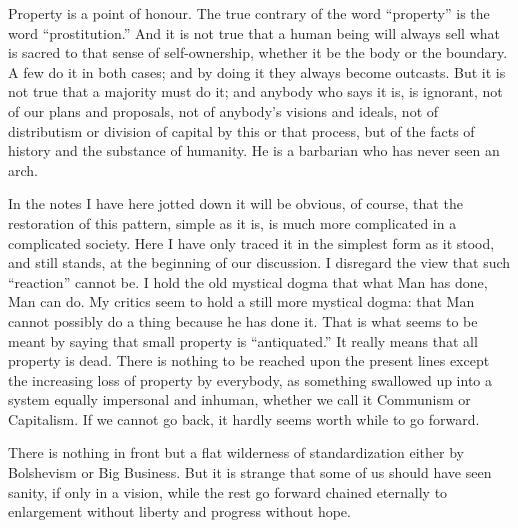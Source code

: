 \documentclass{book}
\begin{document}
Property is a point of honour. The true contrary of the word “property” is the word “prostitution.” And it is not true that a human being will always sell what is sacred to that sense of self-ownership, whether it be the body or the boundary. A few do it in both cases; and by doing it they always become outcasts. But it is not true that a majority must do it; and anybody who says it is, is ignorant, not of our plans and proposals, not of anybody’s visions and ideals, not of distributism or division of capital by this or that process, but of the facts of history and the substance of humanity. He is a barbarian who has never seen an arch.

In the notes I have here jotted down it will be obvious, of course, that the restoration of this pattern, simple as it is, is much more complicated in a complicated society. Here I have only traced it in the simplest form as it stood, and still stands, at the beginning of our discussion. I disregard the view that such “reaction” cannot be. I hold the old mystical dogma that what Man has done, Man can do. My critics seem to hold a still more mystical dogma: that Man cannot possibly do a thing because he has done it. That is what seems to be meant by saying that small property is “antiquated.” It really means that all property is dead. There is nothing to be reached upon the present lines except the increasing loss of property by everybody, as something swallowed up into a system equally impersonal and inhuman, whether we call it Communism or Capitalism. If we cannot go back, it hardly seems worth while to go forward.

There is nothing in front but a flat wilderness of standardization either by Bolshevism or Big Business. But it is strange that some of us should have seen sanity, if only in a vision, while the rest go forward chained eternally to enlargement without liberty and progress without hope.
\end{document}
